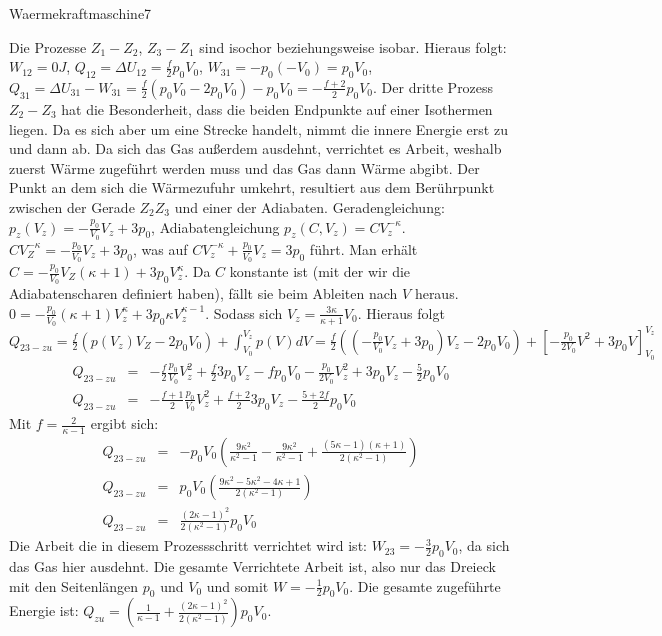 \begin{problem}{Waermekraftmaschine}{7}
\begin{solution}
Die Prozesse $Z_1 - Z_2$, $Z_3 - Z_1$ sind isochor beziehungsweise isobar. Hieraus folgt: $W_{12}=0J$, $Q_{12}=\Delta U_{12}=\frac f2 p_0V_0$, $W_{31}=-p_0(-V_0)=p_0V_0$, $Q_{31}=\Delta U_{31}-W_{31}=\frac f2 (p_0V_0-2p_0V_0)-p_0V_0=-\frac{f+2}2p_0V_0$. Der dritte Prozess $Z_2-Z_3$ hat die Besonderheit, dass die beiden Endpunkte auf einer Isothermen liegen. Da es sich aber um eine Strecke handelt, nimmt die innere Energie erst zu und dann ab. Da sich das Gas außerdem ausdehnt, verrichtet es Arbeit, weshalb zuerst Wärme zugeführt werden muss und das Gas dann Wärme abgibt. Der Punkt an dem sich die Wärmezufuhr umkehrt, resultiert aus dem Berührpunkt zwischen der Gerade $Z_2Z_3$ und einer der Adiabaten. Geradengleichung: $p_z(V_z)=-\frac{p_0}{V_0}V_z+3p_0$, Adiabatengleichung $p_z(C,V_z)=CV_z^{-\kappa}$. $CV_Z^{-\kappa}=-\frac{p_0}{V_0}V_z+3p_0$, was auf $CV_{z}^{-\kappa}+\frac{p_0}{V_0}V_z=3p_0$ führt. Man erhält $C=-\frac{p_0}{V_0}V_Z(\kappa+1)+3p_0V_z^{\kappa}$. Da $C$ konstante ist (mit der wir die Adiabatenscharen definiert haben), fällt sie beim Ableiten nach $V$ heraus. $0=-\frac{p_0}{V_0}(\kappa+1)V_z^{\kappa}+3p_0\kappa V_z^{\kappa -1}$. Sodass sich $V_z=\frac{3\kappa}{\kappa+1}V_0$. Hieraus folgt $Q_{23-zu}=\frac f2 (p(V_z)V_Z-2p_0V_0)+\int_{V_0}^{V_z}p(V)dV=\frac f2 ((-\frac{p_0}{V_0}V_z+3p_0)V_z-2p_0V_0)+[-\frac{p_0}{2V_0}V^2+3p_0V]_{V_0}^{V_z}$
\begin{eqnarray}
\nonumber Q_{23-zu}&=&-\frac f2\frac{p_0}{V_0}V_z^2+\frac f23p_0V_z-fp_0V_0-\frac{p_0}{2V_0}V_z^2+3p_0V_z-\frac 52p_0V_0\\
\nonumber Q_{23-zu}&=&-\frac{f+1}2\frac{p_0}{V_0}V_z^2+\frac{f+2}23p_0V_z-\frac{5+2f}2p_0V_0
\end{eqnarray}
Mit $f=\frac 2{\kappa-1}$ ergibt sich:
\begin{eqnarray}
\nonumber Q_{23-zu}&=&-p_0V_0\left(\frac{9\kappa^2}{\kappa^2-1}-\frac{9\kappa^2}{\kappa^2-1}+\frac{(5\kappa -1)(\kappa +1)}{2(\kappa^2-1)}\right)\\
\nonumber Q_{23-zu}&=&p_0V_0\left(\frac{9\kappa^2-5\kappa^2-4\kappa+1}{2(\kappa^2-1)}\right)\\
\nonumber Q_{23-zu}&=&\frac{(2\kappa-1)^2}{2(\kappa^2-1)}p_0V_0
\end{eqnarray}
Die Arbeit die in diesem Prozessschritt verrichtet wird ist: $W_{23}=-\frac 32p_0V_0$, da sich das Gas hier ausdehnt. Die gesamte Verrichtete Arbeit ist, also nur das Dreieck mit den Seitenlängen $p_0$ und $V_0$ und somit $W=-\frac 12p_0V_0$. Die gesamte zugeführte Energie ist: $Q_{zu}=(\frac 1{\kappa -1}+\frac{(2\kappa-1)^2}{2(\kappa^2-1)})p_0V_0$.

\end{solution}
\end{problem}
